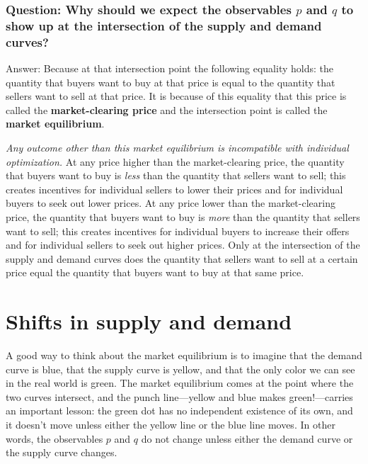 \subsubsection{Question\rm : Why should we expect the observables $p$ and $q$ to show up at the intersection of the supply and demand curves?}

Answer: Because at that intersection point the following equality holds: the quantity that buyers want to buy at that price is equal to the quantity that sellers want to sell at that price. It is because of this equality that this price is called the \textbf{market-clearing price} and the intersection point is called the \textbf{market equilibrium}.

\emph{Any outcome other than this market equilibrium is incompatible with individual optimization.} At any price higher than the market-clearing price, the quantity that buyers want to buy is \emph{less} than the quantity that sellers want to sell; this creates incentives for individual sellers to lower their prices and for individual buyers to seek out lower prices. At any price lower than the market-clearing price, the quantity that buyers want to buy is \emph{more} than the quantity that sellers want to sell; this creates incentives for individual buyers to increase their offers and for individual sellers to seek out higher prices. Only at the intersection of the supply and demand curves does the quantity that sellers want to sell at a certain price equal the quantity that buyers want to buy at that same price.




\section{Shifts in supply and demand}

A good way to think about the market equilibrium is to imagine that the demand curve is blue, that the supply curve is yellow, and that the only color we can see in the real world is green. The market equilibrium comes at the point where the two curves intersect, and the punch line---yellow and blue makes green!---carries an important lesson: the green dot has no independent existence of its own, and it doesn't move unless either the yellow line or the blue line moves. In other words, the observables $p$ and $q$ do not change unless either the demand curve or the supply curve changes.

